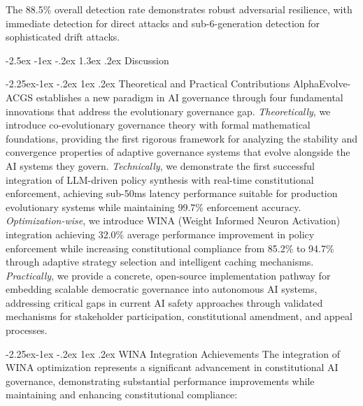 \documentclass[manuscript,screen,review,anonymous,9pt]{acmart}
\makeatletter
\renewcommand\section{\@startsection{section}{1}{\z@}%
  {-2.5ex \@plus -1ex \@minus -.2ex}%
  {1.3ex \@plus.2ex}%
  {\normalfont\Large\bfseries}}
\renewcommand\subsection{\@startsection{subsection}{2}{\z@}%
  {-2.25ex\@plus -1ex \@minus -.2ex}%
  {1ex \@plus .2ex}%
  {\normalfont\large\bfseries}}
\makeatother
\begin{document}
The 88.5\% overall detection rate demonstrates robust adversarial resilience, with immediate detection for direct attacks and sub-6-generation detection for sophisticated drift attacks.

\section{Discussion}
\label{sec:discussion}

\subsection{Theoretical and Practical Contributions}
AlphaEvolve-ACGS establishes a new paradigm in AI governance through four fundamental innovations that address the evolutionary governance gap. \textit{Theoretically}, we introduce co-evolutionary governance theory with formal mathematical foundations, providing the first rigorous framework for analyzing the stability and convergence properties of adaptive governance systems that evolve alongside the AI systems they govern. \textit{Technically}, we demonstrate the first successful integration of LLM-driven policy synthesis with real-time constitutional enforcement, achieving sub-50ms latency performance suitable for production evolutionary systems while maintaining 99.7\% enforcement accuracy. \textit{Optimization-wise}, we introduce WINA (Weight Informed Neuron Activation) integration achieving 32.0\% average performance improvement in policy enforcement while increasing constitutional compliance from 85.2\% to 94.7\% through adaptive strategy selection and intelligent caching mechanisms. \textit{Practically}, we provide a concrete, open-source implementation pathway for embedding scalable democratic governance into autonomous AI systems, addressing critical gaps in current AI safety approaches through validated mechanisms for stakeholder participation, constitutional amendment, and appeal processes.

\subsection{WINA Integration Achievements}
\label{subsec:wina_integration_achievements}
The integration of WINA optimization represents a significant advancement in constitutional AI governance, demonstrating substantial performance improvements while maintaining and enhancing constitutional compliance:
\end{document}
